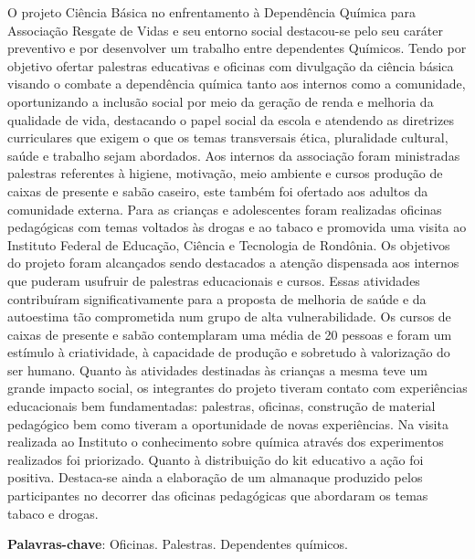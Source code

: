 \documentclass[article,12pt,onesidea,4paper,english,brazil]{abntex2}
\begin{document}
	\noindent O projeto Ciência Básica no enfrentamento à Dependência Química para Associação Resgate de Vidas e seu entorno social destacou-se pelo seu caráter preventivo e por desenvolver um trabalho entre dependentes Químicos. Tendo por objetivo ofertar palestras educativas e oficinas com divulgação da ciência básica visando o combate a dependência química tanto aos internos como a comunidade, oportunizando a inclusão social por meio da geração de renda e melhoria da qualidade de vida, destacando o papel social da escola e atendendo as diretrizes curriculares que exigem o que os temas transversais ética, pluralidade cultural, saúde e trabalho sejam abordados. Aos internos da associação foram ministradas palestras referentes à higiene, motivação, meio ambiente e cursos produção de caixas de presente e sabão caseiro, este também foi ofertado aos adultos da comunidade externa. Para as crianças e adolescentes foram realizadas oficinas pedagógicas com temas voltados às drogas e ao tabaco e promovida uma visita ao Instituto Federal de Educação, Ciência e Tecnologia de Rondônia. Os objetivos do projeto foram alcançados sendo destacados a atenção dispensada aos internos que puderam usufruir de palestras educacionais e cursos. Essas atividades contribuíram significativamente para a proposta de melhoria de saúde e da autoestima tão comprometida num grupo de alta vulnerabilidade. Os cursos de caixas de presente e sabão contemplaram uma média de 20 pessoas e foram um estímulo à criatividade, à capacidade de produção e sobretudo à valorização do ser humano. Quanto às atividades destinadas às crianças a mesma teve um grande impacto social, os integrantes do projeto tiveram contato com experiências educacionais bem fundamentadas: palestras, oficinas, construção de material pedagógico bem como tiveram a oportunidade de novas experiências. Na visita realizada ao Instituto o conhecimento sobre química através dos experimentos realizados foi priorizado. Quanto à distribuição do kit educativo a ação foi positiva. Destaca-se ainda a elaboração de um almanaque produzido pelos participantes no decorrer das oficinas pedagógicas que abordaram os temas tabaco e drogas.
	
	\vspace{\onelineskip}
	
	\noindent
	\textbf{Palavras-chave}: Oficinas. Palestras. Dependentes químicos.
	
\end{document}
